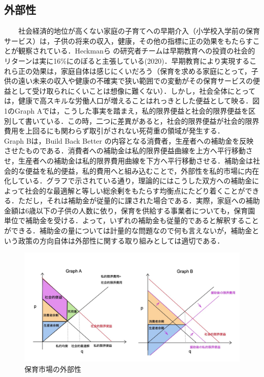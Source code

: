 \documentclass[
]{ltjarticle}
\begin{document}
\hypertarget{ux5916ux90e8ux6027}{%
\subsection{外部性}\label{ux5916ux90e8ux6027}}

~~~~社会経済的地位が高くない家庭の子育てへの早期介入（小学校入学前の保育サービス）は，子供の将来の収入，健康，その他の指標に正の効果をもたらすことが観察されている．Heckmanら
の研究者チームは早期教育への投資の社会的リターンは実に16\%にのぼると主張している(2020)．早期教育により実現するこれら正の効果は，家庭自体は感じにくいだろう（保育を求める家庭にとって，子供の遠い未来の収入や健康の不確実で狭い範囲での変動がその保育サービスの便益として受け取られにくいことは想像に難くない）．しかし，社会全体にとっては，健康で高スキルな労働人口が増えることはれっきとした便益として映る．図1のGraph
Aでは，こうした事実を踏まえ，私的限界便益と社会的限界便益を区別して書いている．この時，二つに差異があると，社会的限界便益が社会的限界費用を上回るにも関わらず取引がされない死荷重の領域が発生する．\\
\hspace*{0.333em}\hspace*{0.333em}\hspace*{0.333em}\hspace*{0.333em}Graph
Bは，Build Back Better
の内容となる消費者，生産者への補助金を反映させたものである．消費者への補助金は私的限界便益曲線を上方へ平行移動させ，生産者への補助金は私的限界費用曲線を下方へ平行移動させる．補助金は社会的な便益を私的便益，私的費用へと組み込むことで，外部性を私的市場に内在化している．グラフで示されている通り，理論的にはこうした双方への補助金によって社会的な最適解と等しい総余剰をもたらす均衡点にたどり着くことができる．ただし，それは補助金が従量的に課された場合である．実際，家庭への補助金額は6歳以下の子供の人数に依り，保育を供給する事業者についても，保育園単位で補助金を受ける．よって，いずれの補助金も従量的であると解釈することができる．補助金の量については計量的な問題なので何も言えないが，補助金という政策の方向自体は外部性に関する取り組みとしては適切である．

\begin{figure}
\caption{保育市場の外部性}
\centering
\includegraphics[width=\textwidth]{fig1.jpg}
\end{figure}
\end{document}
